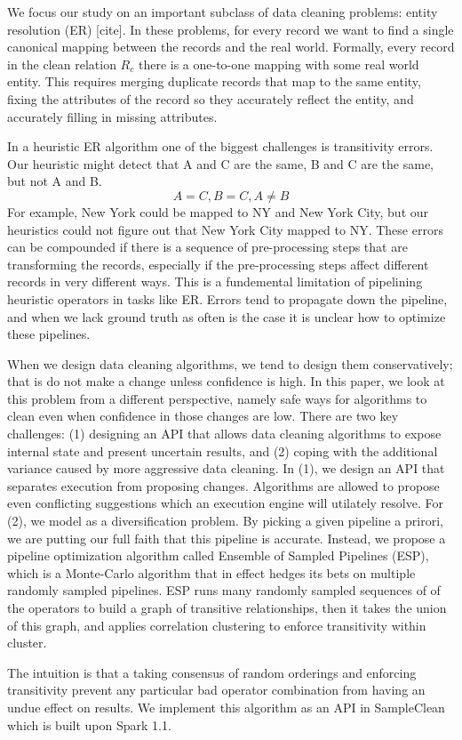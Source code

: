 We focus our study on an important subclass of data cleaning problems: entity resolution (ER) [cite]. 
In these problems, for every record we want to find a single canonical mapping between the records and the real world.
Formally, every record in the clean relation $R_c$ there is a one-to-one mapping with some real world entity.
This requires merging duplicate records that map to the same entity, fixing the attributes of the record so they accurately reflect the entity, and accurately filling in missing attributes.

In a heuristic ER algorithm one of the biggest challenges is transitivity errors.
Our heuristic might detect that A and C are the same, B and C are the same, but not A and B.
\[ A = C, B = C, A \ne B\]
For example, New York could be mapped to NY and New York City, but our heuristics could not figure out that New York City mapped to NY.
These errors can be compounded if there is a sequence of pre-processing steps that are transforming the records, especially if the pre-processing steps affect different records in very different ways.
This is a fundemental limitation of pipelining heuristic operators in tasks like ER.
Errors tend to propagate down the pipeline, and when we lack ground truth as often is the case it is unclear how to optimize these pipelines.

When we design data cleaning algorithms, we tend to design them conservatively; that is do not make a change unless confidence is high.
In this paper, we look at this problem from a different perspective, namely safe ways for algorithms to clean even when confidence in those changes are low.
There are two key challenges: (1) designing an API that allows data cleaning algorithms to expose internal state and present uncertain results, and (2) coping with the additional variance caused by more aggressive data cleaning.
In (1), we design an API that separates execution from proposing changes. 
Algorithms are allowed to propose even conflicting suggestions which an execution engine will utilately resolve.
For (2), we model as a diversification problem. 
By picking a given pipeline a prirori, we are putting our full faith that this pipeline is accurate.
Instead, we propose a pipeline optimization algorithm called Ensemble of Sampled Pipelines (ESP), which is a Monte-Carlo algorithm that in effect hedges its bets on multiple randomly sampled pipelines.
ESP runs many randomly sampled sequences of of the operators to build a graph of transitive relationships, then it takes the union of this graph, and applies correlation clustering to enforce transitivity within cluster.

The intuition is that a taking consensus of random orderings and enforcing transitivity prevent any particular bad operator combination from having an undue effect on results.  
We implement this algorithm as an API in SampleClean which is built upon Spark 1.1.








